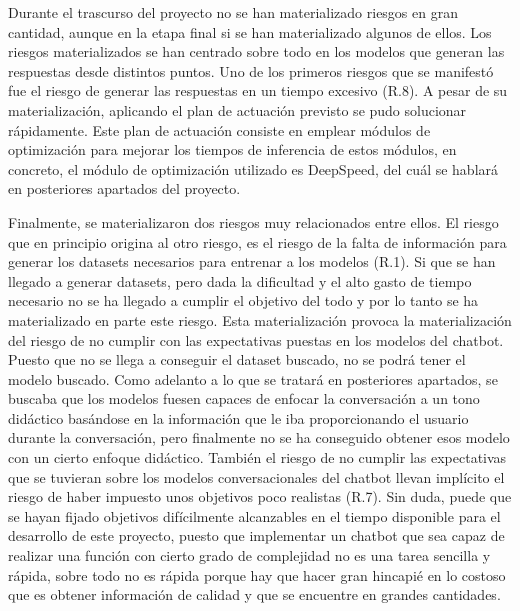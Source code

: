 Durante el trascurso del proyecto no se han materializado riesgos en gran cantidad, aunque en la etapa final si se han materializado algunos de ellos. Los riesgos materializados se han centrado sobre todo en los modelos que generan las respuestas desde distintos puntos. Uno de los primeros riesgos que se manifestó fue el riesgo de generar las respuestas en un tiempo excesivo (R.8). A pesar de su materialización, aplicando el plan de actuación previsto se pudo solucionar rápidamente. Este plan de actuación consiste en emplear módulos de optimización para mejorar los tiempos de inferencia de estos módulos, en concreto, el módulo de optimización utilizado es DeepSpeed, del cuál se hablará en posteriores apartados del proyecto.

Finalmente, se materializaron dos riesgos muy relacionados entre ellos. El riesgo que en principio origina al otro riesgo, es el riesgo de la falta de información para generar los datasets necesarios para entrenar a los modelos (R.1). Si que se han llegado a generar datasets, pero dada la dificultad y el alto gasto de tiempo necesario no se ha llegado a cumplir el objetivo del todo y por lo tanto se ha materializado en parte este riesgo. Esta materialización provoca la materialización del riesgo de no cumplir con las expectativas puestas en los modelos del chatbot. Puesto que no se llega a conseguir el dataset buscado, no se podrá tener el modelo buscado. Como adelanto a lo que se tratará en posteriores apartados, se buscaba que los modelos fuesen capaces de enfocar la conversación a un tono didáctico basándose en la información que le iba proporcionando el usuario durante la conversación, pero finalmente no se ha conseguido obtener esos modelo con un cierto enfoque didáctico. También el riesgo de no cumplir las expectativas que se tuvieran sobre los modelos conversacionales del chatbot llevan implícito el riesgo de haber impuesto unos objetivos poco realistas (R.7). Sin duda, puede que se hayan fijado objetivos difícilmente alcanzables en el tiempo disponible para el desarrollo de este proyecto, puesto que implementar un chatbot que sea capaz de realizar una función con cierto grado de complejidad no es una tarea sencilla y rápida, sobre todo no es rápida porque hay que hacer gran hincapié en lo costoso que es obtener información de calidad y que se encuentre en grandes cantidades.






